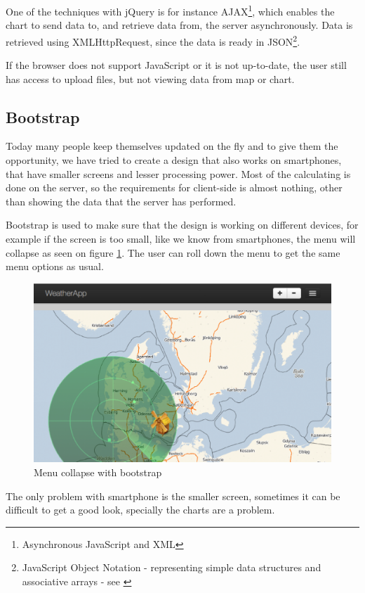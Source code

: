 One of the techniques with jQuery is for instance AJAX\footnote{Asynchronous JavaScript and XML}, which enables the chart to send data to, and retrieve data from, the server asynchronously. Data is retrieved using XMLHttpRequest, since the data is ready in JSON\footnote{JavaScript Object Notation - representing simple data structures and associative arrays - see \cite{json}}.

If the browser does not support JavaScript or it is not up-to-date, the user still has access to upload files, but not viewing data from map or chart.

\subsection{Bootstrap}
\label{sec:bootstrap}
Today many people keep themselves updated on the fly and to give them the opportunity, we have tried to create a design that also works on smartphones, that have smaller screens and lesser processing power. Most of the calculating is done on the server, so the requirements for client-side is almost nothing, other than showing the data that the server has performed.

Bootstrap is used to make sure that the design is working on different devices, for example if the screen is too small, like we know from smartphones, the menu will collapse as seen on figure \ref{fig:bootstrap}. The user can roll down the menu to get the same menu options as usual.

\begin{figure}[htbp]
\centering
   \includegraphics[scale=.5]{figure/bootstrap.eps}
   \caption{Menu collapse with bootstrap}
   \label{fig:bootstrap}
\end{figure}

The only problem with smartphone is the smaller screen, sometimes it can be difficult to get a good look, specially the charts are a problem.


